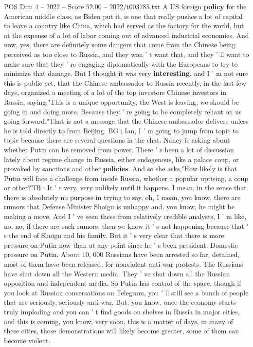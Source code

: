 \begin{textsample}{POS Dim 4 – 2022 – Score 52.00 – 2022/t003785.txt}
A US foreign \textbf{policy} for the American middle class, as Biden put it, is one that really pushes a lot of capital to leave a country like China, which had served as the factory for the world, but at the expense of a lot of labor coming out of advanced industrial economies.
And now, yes, there are definitely some dangers that come from the Chinese being perceived as too close to Russia, and they won ' t want that, and they ' ll want to make sure that they ' re engaging diplomatically with the Europeans to try to minimize that damage.
But I thought it was very \textbf{interesting}, and I ' m not sure this is public yet, that the Chinese ambassador to Russia recently, in the last few days, organized a meeting of a lot of the top investors Chinese investors in Russia, saying,"This is a unique opportunity, the West is leaving, we should be going in and doing more.
Because they ' re going to be completely reliant on us going forward."That is not a message that the Chinese ambassador delivers unless he is told directly to from Beijing.
BG : Ian, I ' m going to jump from topic to topic because there are several questions in the chat.
Nancy is asking about whether Putin can be removed from power.
There ' s been a lot of discussion lately about regime change in Russia, either endogenous, like a palace coup, or provoked by sanctions and other \textbf{policies}.
And so she asks,"How likely is that Putin will face a challenge from inside Russia, whether a popular uprising, a coup or other?"IB : It ' s very, very unlikely until it happens.
I mean, in the sense that there is absolutely no purpose in trying to say, oh, I mean, you know, there are rumors that Defense Minister Shoigu is unhappy and, you know, he might be making a move.
And I ' ve seen these from relatively credible analysts, I ' m like, no, no, if there are such rumors, then we know it ' s not happening because that ' s the end of Shoigu and his family.
But it ' s very clear that there is more pressure on Putin now than at any point since he ' s been president.
Domestic pressure on Putin.
About 10, 000 Russians have been arrested so far, detained, most of them have been released, for nonviolent anti-war protests.
The Russians have shut down all the Western media.
They ' ve shut down all the Russian opposition and independent media.
So Putin has control of the space, though if you look at Russian conversations on Telegram, you ' ll still see a bunch of people that are seriously, seriously anti-war.
But, you know, once the economy starts truly imploding and you can ' t find goods on shelves in Russia in major cities, and this is coming, you know, very soon, this is a matter of days, in many of these cities, those demonstrations will likely become greater, some of them can become violent.

\end{textsample}

